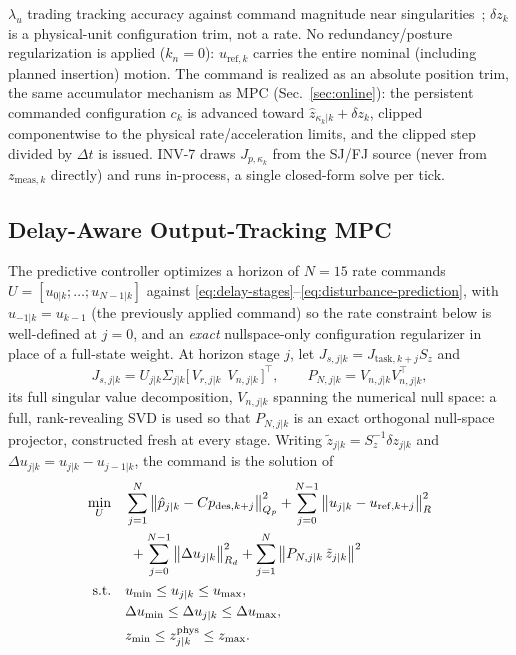\documentclass[journal]{IEEEtran}
\begin{document}
$\lambda_u$ trading tracking accuracy against command magnitude near
singularities~\cite{chiaverini1994review}; $\delta z_k$ is a physical-unit
configuration trim, not a rate. No redundancy/posture regularization is
applied ($k_n=0$): $u_{\mathrm{ref},k}$ carries the entire nominal
(including planned insertion) motion. The command is realized as an
absolute position trim, the same accumulator mechanism as MPC
(Sec.~\ref{sec:online}): the persistent commanded configuration $c_k$ is
advanced toward $\hat z_{\kappa_k|k}+\delta z_k$, clipped componentwise to
the physical rate/acceleration limits, and the clipped step divided by
$\Delta t$ is issued. INV-7 draws $J_{p,\kappa_k}$ from the SJ/FJ source
(never from $z_{\mathrm{meas},k}$ directly) and runs in-process, a single
closed-form solve per tick.

\subsection{Delay-Aware Output-Tracking MPC}
\label{sec:mpc}
The predictive controller optimizes a horizon of $N=15$ rate commands
$U=[u_{0|k};\dots;u_{N-1|k}]$ against \eqref{eq:delay-stages}--\eqref{eq:disturbance-prediction},
with $u_{-1|k}=u_{k-1}$ (the previously applied command) so the rate
constraint below is well-defined at $j=0$, and an \emph{exact}
nullspace-only configuration regularizer in place of a full-state weight.
At horizon stage $j$, let $J_{s,j|k}=J_{\mathrm{task},k+j}S_z$ and
\begin{equation}
J_{s,j|k}=U_{j|k}\Sigma_{j|k}\big[\,V_{r,j|k}\ \ V_{n,j|k}\,\big]^{\top},
\qquad P_{N,j|k}=V_{n,j|k}V_{n,j|k}^{\top},
\label{eq:pn}
\end{equation}
its full singular value decomposition, $V_{n,j|k}$ spanning the numerical
null space: a full, rank-revealing SVD is used so that $P_{N,j|k}$ is an
exact orthogonal null-space projector, constructed fresh at every stage.
Writing $\tilde z_{j|k}=S_z^{-1}\delta z_{j|k}$ and
$\Delta u_{j|k}=u_{j|k}-u_{j-1|k}$, the command is the solution of
\begin{subequations}
\label{eq:mpc}
\begin{align}
\min_{U}\quad &
\sum_{j=1}^{N}\big\lVert \hat p_{j|k}-Cp_{\mathrm{des},k+j}\big\rVert^2_{Q_p}
+ \sum_{j=0}^{N-1}\big\lVert u_{j|k}-u_{\mathrm{ref},k+j}\big\rVert^2_{R}
\notag\\
&\ + \sum_{j=0}^{N-1}\big\lVert \Delta u_{j|k}\big\rVert^2_{R_d}
+ \sum_{j=1}^{N}\big\lVert P_{N,j|k}\,\tilde z_{j|k}\big\rVert^2
\label{eq:mpc-objective}\\
\text{s.t.}\quad & u_{\min}\le u_{j|k}\le u_{\max},
\label{eq:mpc-input}\\
& \Delta u_{\min}\le \Delta u_{j|k}\le \Delta u_{\max},
\label{eq:mpc-rate}\\
& z_{\min}\le z^{\mathrm{phys}}_{j|k}\le z_{\max}.
\label{eq:mpc-state}
\end{align}
\end{subequations}
\end{document}

